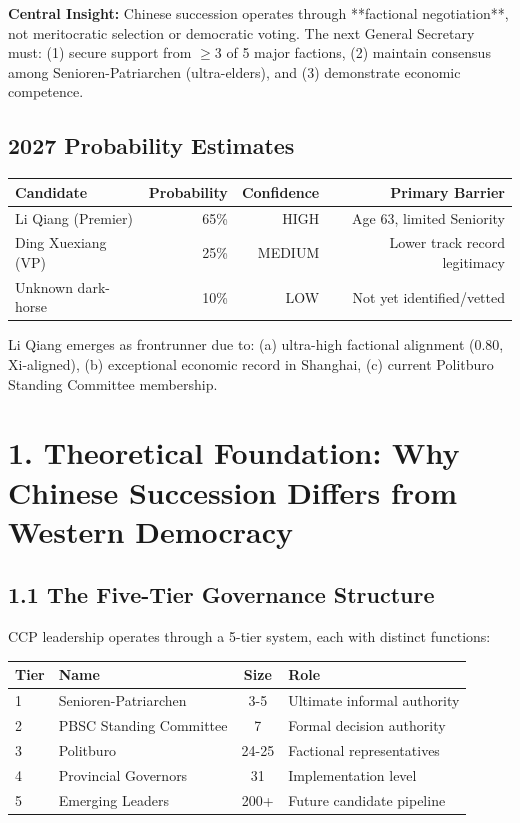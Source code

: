 \documentclass[11pt]{article}
\begin{document}
\textbf{Central Insight:} Chinese succession operates through **factional negotiation**, not meritocratic selection or democratic voting. The next General Secretary must: (1) secure support from $\geq 3$ of 5 major factions, (2) maintain consensus among Senioren-Patriarchen (ultra-elders), and (3) demonstrate economic competence.

\subsection{2027 Probability Estimates}

\begin{table}[h]
\centering
\begin{tabular}{|l|r|r|r|}
\hline
\textbf{Candidate} & \textbf{Probability} & \textbf{Confidence} & \textbf{Primary Barrier} \\
\hline
Li Qiang (Premier) & 65\% & HIGH & Age 63, limited Seniority \\
Ding Xuexiang (VP) & 25\% & MEDIUM & Lower track record legitimacy \\
Unknown dark-horse & 10\% & LOW & Not yet identified/vetted \\
\hline
\end{tabular}
\end{table}

Li Qiang emerges as frontrunner due to: (a) ultra-high factional alignment (0.80, Xi-aligned), (b) exceptional economic record in Shanghai, (c) current Politburo Standing Committee membership.

\section{1. Theoretical Foundation: Why Chinese Succession Differs from Western Democracy}

\subsection{1.1 The Five-Tier Governance Structure}

CCP leadership operates through a 5-tier system, each with distinct functions:

\begin{table}[h]
\centering
\begin{tabular}{|l|l|c|l|}
\hline
\textbf{Tier} & \textbf{Name} & \textbf{Size} & \textbf{Role} \\
\hline
1 & Senioren-Patriarchen & 3-5 & Ultimate informal authority \\
2 & PBSC Standing Committee & 7 & Formal decision authority \\
3 & Politburo & 24-25 & Factional representatives \\
4 & Provincial Governors & 31 & Implementation level \\
5 & Emerging Leaders & 200+ & Future candidate pipeline \\
\hline
\end{tabular}
\end{table}
\end{document}
